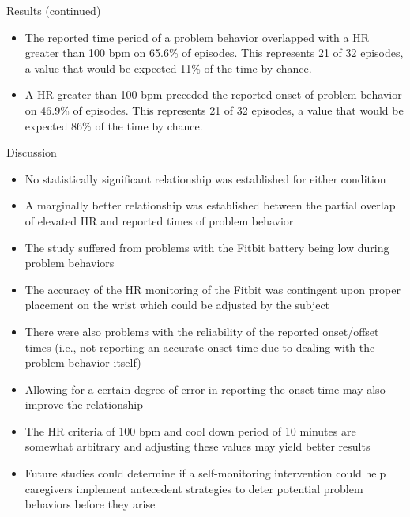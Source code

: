 \documentclass[final]{beamer}
\newlength{\onecolwid}
\begin{document}
\begin{frame}[t]
\begin{columns}[t]
\begin{column}{\onecolwid}
\begin{alertblock}{Results (continued)}
	\begin{itemize}
		\item The reported time period of a problem behavior overlapped with a HR greater than 100 bpm on 65.6\% of episodes. This represents 21 of 32 episodes, a value that would be expected 11\% of the time by chance.
		\item A HR greater than 100 bpm preceded the reported onset of problem behavior on 46.9\% of episodes. This represents 21 of 32 episodes, a value that would be expected 86\% of the time by chance.
		
	\end{itemize}
	
\end{alertblock}


\begin{alertblock}{Discussion}
	
	\begin{itemize}
		\item No statistically significant relationship was established for either condition
		\item A marginally better relationship was established between the partial overlap of elevated HR and reported times of problem behavior
		\item The study suffered from problems with the Fitbit battery being low during problem behaviors
		\item The accuracy of the HR monitoring of the Fitbit was contingent upon proper placement on the wrist which could be adjusted by the subject
		\item There were also problems with the reliability of the reported onset/offset times (i.e., not reporting an accurate onset time due to dealing with the problem behavior itself)
		\item Allowing for a certain degree of error in reporting the onset time may also improve the relationship
		\item The HR criteria of 100 bpm and cool down period of 10 minutes are somewhat arbitrary and adjusting these values may yield better results
		\item Future studies could determine if a self-monitoring intervention could help caregivers implement antecedent strategies to deter potential problem behaviors before they arise
	\end{itemize}
	

\end{alertblock}
\end{column}
\end{columns}
\end{frame}
\end{document}
